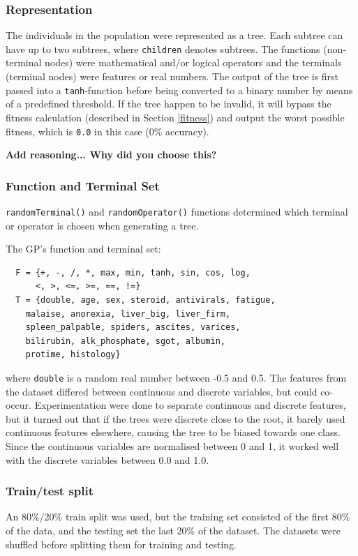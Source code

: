 \documentclass{article}
\begin{document}
\subsubsection{Representation}
The individuals in the population were represented as a tree. Each subtree can have up to two subtrees, where \texttt{children} denotes subtrees. The functions (non-terminal nodes) were mathematical and/or logical operators and the terminals (terminal nodes) were features or real numbers. The output of the tree is first passed into a \texttt{tanh}-function before being converted to a binary number by means of a predefined threshold. If the tree happen to be invalid, it will bypass the fitness calculation (described in Section \ref{fitness}) and output the worst possible fitness, which is \texttt{0.0} in this case (0\% accuracy).

\textbf{Add reasoning... Why did you choose this?}

\subsubsection{Function and Terminal Set}
\texttt{randomTerminal()} and \texttt{randomOperator()} functions determined which terminal or operator is chosen when generating a tree.

The GP's function and terminal set:
\begin{verbatim}
  F = {+, -, /, *, max, min, tanh, sin, cos, log, 
      <, >, <=, >=, ==, !=}
  T = {double, age, sex, steroid, antivirals, fatigue,
    malaise, anorexia, liver_big, liver_firm,
    spleen_palpable, spiders, ascites, varices,
    bilirubin, alk_phosphate, sgot, albumin,
    protime, histology}
\end{verbatim}
where \texttt{double} is a random real number between -0.5 and 0.5. The features from the dataset differed between continuous and discrete variables, but could co-occur. Experimentation were done to separate continuous and discrete features, but it turned out that if the trees were discrete close to the root, it barely used continuous features elsewhere, causing the tree to be biased towards one class. Since the continuous variables are normalised between 0 and 1, it worked well with the discrete variables between 0.0 and 1.0.

\subsubsection{Train/test split}
An 80\%/20\% train split was used, but the training set consisted of the first 80\% of the data, and the testing set the last 20\% of the dataset. The datasets were shuffled before splitting them for training and testing.
\end{document}
